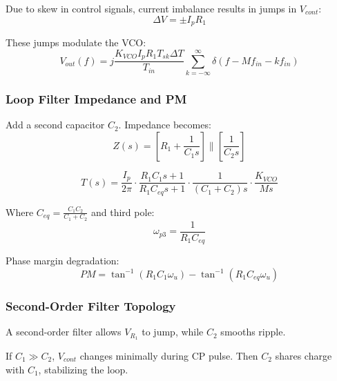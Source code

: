 
Due to skew in control signals, current imbalance results in jumps in $V_{cont}$:
\[
\Delta V = \pm I_p R_1
\]

These jumps modulate the VCO:
\[
V_{out}(f) = j\frac{K_{VCO} I_p R_1 T_{sk} \Delta T}{T_{in}} \sum_{k=-\infty}^{\infty} \delta(f - M f_{in} - k f_{in})
\]

\subsubsection{Loop Filter Impedance and PM}
Add a second capacitor $C_2$. Impedance becomes:
\[
Z(s) = \left[R_1 + \frac{1}{C_1 s} \right] \parallel \left[ \frac{1}{C_2 s} \right]
\]


\[
T(s) = \frac{I_p}{2\pi} \cdot \frac{R_1 C_1 s + 1}{R_1 C_{eq} s + 1} \cdot \frac{1}{(C_1 + C_2)s} \cdot \frac{K_{VCO}}{Ms}
\]

Where $C_{eq} = \frac{C_1 C_2}{C_1 + C_2}$ and third pole:
\[
\omega_{p3} = \frac{1}{R_1 C_{eq}}
\]


Phase margin degradation:
\[
PM = \tan^{-1}(R_1 C_1 \omega_u) - \tan^{-1}(R_1 C_{eq} \omega_u)
\]

\subsubsection{Second-Order Filter Topology}
A second-order filter allows $V_{R_1}$ to jump, while $C_2$ smooths ripple.


If $C_1 \gg C_2$, $V_{cont}$ changes minimally during CP pulse. Then $C_2$ shares charge with $C_1$, stabilizing the loop.

